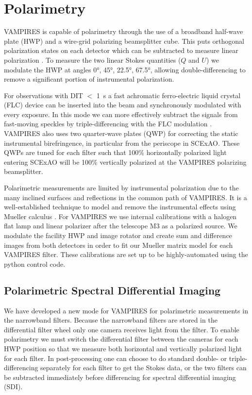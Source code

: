 \section{Polarimetry}\label{sec:polarimetry}

VAMPIRES is capable of polarimetry through the use of a broadband half-wave plate (HWP) and a wire-grid polarizing beamsplitter cube. This puts orthogonal polarization states on each detector which can be subtracted to measure linear polarization \citep{kuhn_imaging_2001}. To measure the two linear Stokes quantities ($Q$ and $U$) we modulate the HWP at angles \ang{0}, \ang{45}, \ang{22.5}, \ang{67.5}, allowing double-differencing to remove a significant portion of instrumental polarization.

For observations with DIT $<$ \SI{1}{\second} a fast achromatic ferro-electric liquid crystal (FLC) device can be inserted into the beam and synchronously modulated with every exposure. In this mode we can more effectively subtract the signals from fast-moving speckles by triple-differencing with the FLC modulation \citep{norris_vampires_2015}. VAMPIRES also uses two quarter-wave plates (QWP) for correcting the static instrumental birefringence, in particular from the periscope in SCExAO. These QWPs are tuned for each filter such that 100\% horizontally polarized light entering SCExAO will be 100\% vertically polarized at the VAMPIRES polarizing beamsplitter.

Polarimetric measurements are limited by instrumental polarization due to the many inclined surfaces and reflections in the common path of VAMPIRES. It is a well-established technique to model and remove the instrumental effects using Mueller calculus \citep{holstein_polarimetric_2020,joost_t_hart_full_2021}. For VAMPIRES we use internal calibrations with a halogen flat lamp and linear polarizer after the telescope M3 as a polarized source. We modulate the facility HWP and image rotator and create sum and difference images from both detectors in order to fit our Mueller matrix model for each VAMPIRES filter.  These calibrations are set up to be highly-automated using the python control code. 

\subsection{Polarimetric Spectral Differential Imaging}

We have developed a new mode for VAMPIRES for polarimetric measurements in the narrowband filters. Because the narrowband filters are stored in the differential filter wheel only one camera receives light from the filter. To enable polarimetry we must switch the differential filter between the cameras for each HWP position so that we measure both horizontal and vertically polarized light for each filter. In post-processing one can choose to do standard double- or triple-differencing separately for each filter to get the Stokes data, or the two filters can be subtracted immediately before differencing for spectral differential imaging (SDI).

